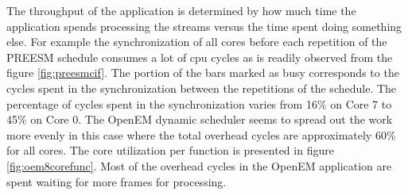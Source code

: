 The throughput of the application is determined by how much time the application
spends processing the streams versus the time spent doing something else. For
example the synchronization of all cores before each repetition of the PREESM
schedule consumes a lot of cpu cycles as is readily observed from the figure
\ref{fig:preesmcif}. The portion of the bars marked as busy corresponds to the
cycles spent in the synchronization between the repetitions of the schedule. The
percentage of cycles spent in the synchronization varies from 16\% on Core 7
to 45\% on Core 0. The OpenEM dynamic scheduler seems to spread out the work
more evenly in this case where the total overhead cycles are approximately 60\%
for all cores. The core utilization per function is presented in figure
\ref{fig:oem8corefunc}. Most of the overhead cycles in the OpenEM application
are spent waiting for more frames for processing.

